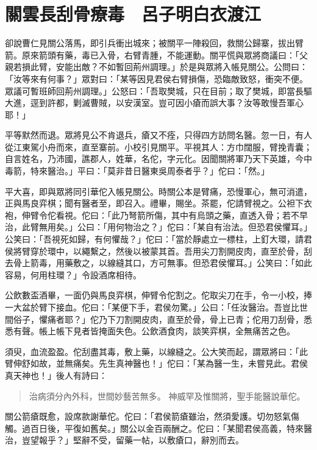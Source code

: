 
\chapter{關雲長刮骨療毒　呂子明白衣渡江}

卻說曹仁見關公落馬，即引兵衝出城來；被關平一陣殺回，救關公歸寨，拔出臂箭。原來箭頭有藥，毒已入骨，右臂青腫，不能運動。關平慌與眾將商議曰：「父親若損此臂，安能出敵？不如暫回荊州調理。」於是與眾將入帳見關公。公問曰：「汝等來有何事？」眾對曰：「某等因見君侯右臂損傷，恐臨敵致怒，衝突不便。眾議可暫班師回荊州調理。」公怒曰：「吾取樊城，只在目前；取了樊城，即當長驅大進，逕到許都，剿滅曹賊，以安漢室。豈可因小瘡而誤大事？汝等敢慢吾軍心耶！」

平等默然而退。眾將見公不肯退兵，瘡又不痊，只得四方訪問名醫。忽一日，有人從江東駕小舟而來，直至寨前。小校引見關平。平視其人：方巾闊服，臂挽青囊；自言姓名，乃沛國，譙郡人，姓華，名佗，字元化。因聞關將軍乃天下英雄，今中毒箭，特來醫治。」平曰：「莫非昔日醫東吳周泰者乎？」佗曰：「然。」

平大喜，即與眾將同引華佗入帳見關公。時關公本是臂痛，恐慢軍心，無可消遣，正與馬良弈棋；聞有醫者至，即召入。禮畢，賜坐。茶罷，佗請臂視之。公袒下衣袍，伸臂令佗看視。佗曰：「此乃弩箭所傷，其中有烏頭之藥，直透入骨；若不早治，此臂無用矣。」公曰：「用何物治之？」佗曰：「某自有治法。但恐君侯懼耳。」公笑曰：「吾視死如歸，有何懼哉？」佗曰：「當於靜處立一標柱，上釘大環，請君侯將臂穿於環中，以繩繫之，然後以被蒙其首。吾用尖刀割開皮肉，直至於骨，刮去骨上箭毒，用藥敷之，以線縫其口，方可無事。但恐君侯懼耳。」公笑曰：「如此容易，何用柱環？」令設酒席相待。

公飲數盃酒畢，一面仍與馬良弈棋，伸臂令佗割之。佗取尖刀在手，令一小校，捧一大盆於臂下接血。佗曰：「某便下手，君侯勿驚。」公曰：「任汝醫治。吾豈比世間俗子，懼痛者耶？」佗乃下刀割開皮肉，直至於骨，骨上已青；佗用刀刮骨，悉悉有聲。帳上帳下見者皆掩面失色。公飲酒食肉，談笑弈棋，全無痛苦之色。

須臾，血流盈盈。佗刮盡其毒，敷上藥，以線縫之。公大笑而起，謂眾將曰：「此臂伸舒如故，並無痛矣。先生真神醫也！」佗曰：「某為醫一生，未嘗見此。君侯真天神也！」後人有詩曰：

\begin{quote}
治病須分內外科，世間妙藝苦無多。
神威罕及惟關將，聖手能醫說華佗。
\end{quote}

關公箭瘡既愈，設席款謝華佗。佗曰：「君侯箭瘡雖治，然須愛護。切勿怒氣傷觸。過百日後，平復如舊矣。」關公以金百兩酬之。佗曰：「某聞君侯高義，特來醫治，豈望報乎？」堅辭不受，留藥一帖，以敷瘡口，辭別而去。

